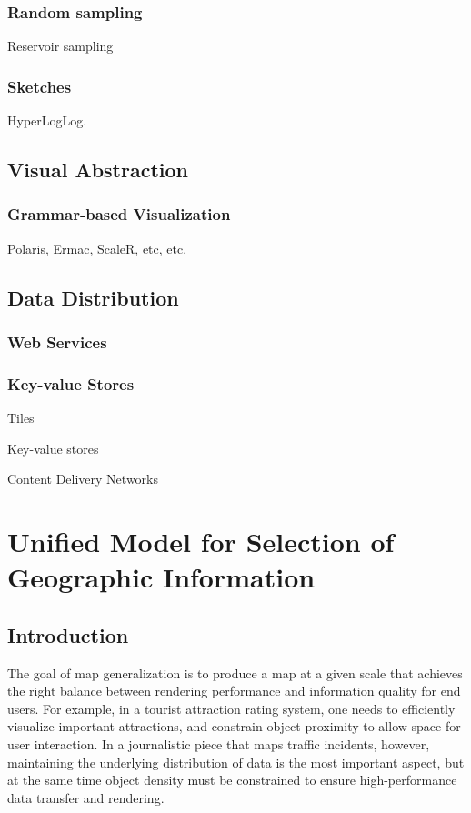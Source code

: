 \documentclass[11pt, oneside]{report}
\begin{document}
{\subsection{Random sampling}

Reservoir sampling

\subsection{Sketches}

HyperLogLog.

\section{Visual Abstraction}

\subsection{Grammar-based Visualization}
Polaris, Ermac, ScaleR, etc, etc.


\section{Data Distribution}

\subsection{Web Services}

\subsection{Key-value Stores}

Tiles

Key-value stores

Content Delivery Networks


\chapter{Unified Model for Selection of Geographic Information}
\label{chapter:cvl}
\lstset{
  language=cvl
}

\section{Introduction}
\label{sec:cvl:introduction}
The goal of map generalization is to produce a map at a given scale that achieves the right balance between rendering performance and information quality for end users. For example, in a tourist attraction rating system, one needs to efficiently visualize important attractions, and constrain object proximity to allow space for user interaction. In a journalistic piece that maps traffic incidents, however, maintaining the underlying distribution of data is the most important aspect, but at the same time object density must be constrained to ensure high-performance data transfer and rendering.

}
\end{document}
